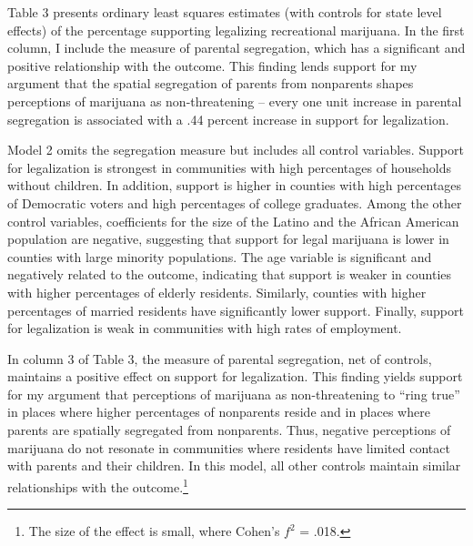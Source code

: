 Table 3 presents ordinary least squares estimates (with controls for state level effects) of the percentage supporting legalizing recreational marijuana. In the first column, I include the measure of parental segregation, which has a significant and positive relationship with the outcome. This finding lends support for my argument that the spatial segregation of parents from nonparents shapes perceptions of marijuana as non-threatening -- every one unit increase in parental segregation is associated with a .44 percent increase in support for legalization. 

Model 2 omits the segregation measure but includes all control variables. Support for legalization is strongest in communities with high percentages of households without children. In addition, support is higher in counties with high percentages of Democratic voters and high percentages of college graduates. Among the other control variables, coefficients for the size of the Latino and the African American population are negative, suggesting that support for legal marijuana is lower in counties with large minority populations. The age variable is significant and negatively related to the outcome, indicating that support is weaker in counties with higher percentages of elderly residents. Similarly, counties with higher percentages of married residents have significantly lower support. Finally, support for legalization is weak in communities with high rates of employment. 


In column 3 of Table 3, the measure of parental segregation, net of controls, maintains a positive effect on support for legalization. This finding yields support for my argument that perceptions of marijuana as non-threatening to ``ring true'' in places where higher percentages of nonparents reside and in places where parents are spatially segregated from nonparents. Thus, negative perceptions of marijuana do not resonate in communities where residents have limited contact with parents and their children. In this model, all other controls maintain similar relationships with the outcome.\footnote{The size of the effect is small, where Cohen's $f^{2}$ = .018.} %

